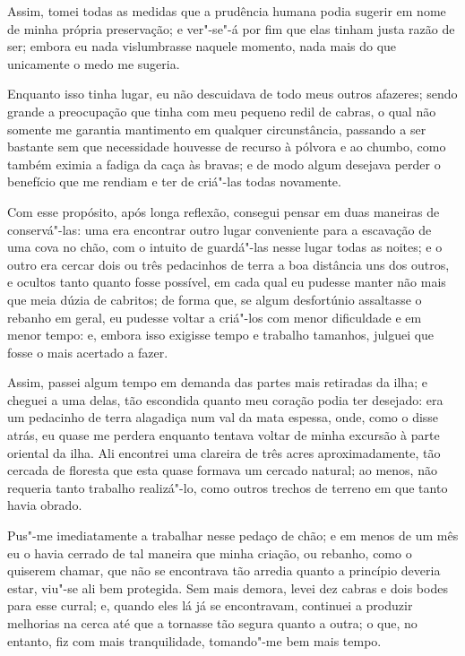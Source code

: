 Assim, tomei todas as medidas que a prudência humana podia sugerir em
nome de minha própria preservação; e ver"-se"-á por fim que elas tinham
justa razão de ser; embora eu nada vislumbrasse naquele momento, nada
mais do que unicamente o medo me sugeria.

Enquanto isso tinha lugar, eu não descuidava de todo meus outros
afazeres; sendo grande a preocupação que tinha com meu pequeno redil de
cabras, o qual não somente me garantia mantimento em qualquer
circunstância, passando a ser bastante sem que necessidade houvesse de
recurso à pólvora e ao chumbo, como também eximia a fadiga da caça às
bravas; e de modo algum desejava perder o benefício que me rendiam e ter
de criá"-las todas novamente.

Com esse propósito, após longa reflexão, consegui pensar em duas
maneiras de conservá"-las: uma era encontrar outro lugar conveniente para
a escavação de uma cova no chão, com o intuito de guardá"-las nesse lugar
todas as noites; e o outro era cercar dois ou três pedacinhos de terra a
boa distância uns dos outros, e ocultos tanto quanto fosse possível, em
cada qual eu pudesse manter não mais que meia dúzia de cabritos; de
forma que, se algum desfortúnio assaltasse o rebanho em geral, eu
pudesse voltar a criá"-los com menor dificuldade e em menor tempo: e,
embora isso exigisse tempo e trabalho tamanhos, julguei que fosse o mais
acertado a fazer.

Assim, passei algum tempo em demanda das partes mais retiradas da ilha;
e cheguei a uma delas, tão escondida quanto meu coração podia ter
desejado: era um pedacinho de terra alagadiça num val da mata espessa,
onde, como o disse atrás, eu quase me perdera enquanto tentava voltar de
minha excursão à parte oriental da ilha. Ali encontrei uma clareira de
três acres aproximadamente, tão cercada de floresta que esta quase
formava um cercado natural; ao menos, não requeria tanto trabalho
realizá"-lo, como outros trechos de terreno em que tanto havia obrado.

Pus"-me imediatamente a trabalhar nesse pedaço de chão; e em menos de um
mês eu o havia cerrado de tal maneira que minha criação, ou rebanho,
como o quiserem chamar, que não se encontrava tão arredia quanto a
princípio deveria estar, viu"-se ali bem protegida. Sem mais demora,
levei dez cabras e dois bodes para esse curral; e, quando eles lá já se
encontravam, continuei a produzir melhorias na cerca até que a tornasse
tão segura quanto a outra; o que, no entanto, fiz com mais
tranquilidade, tomando"-me bem mais tempo.


